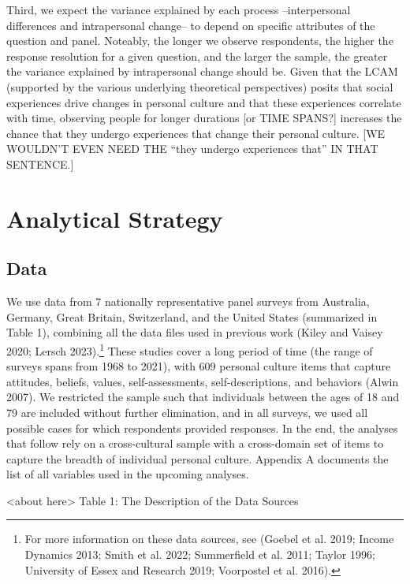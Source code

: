 \documentclass[
  11pt,
]{article}
\begin{document}
Third, we expect the variance explained by each process --interpersonal
differences and intrapersonal change-- to depend on specific attributes
of the question and panel. Noteably, the longer we observe respondents,
the higher the response resolution for a given question, and the larger
the sample, the greater the variance explained by intrapersonal change
should be. Given that the LCAM (supported by the various underlying
theoretical perspectives) posits that social experiences drive changes
in personal culture and that these experiences correlate with time,
observing people for longer durations {[}or TIME SPANS?{]} increases the
chance that they undergo experiences that change their personal culture.
{[}WE WOULDN'T EVEN NEED THE ``they undergo experiences that'' IN THAT
SENTENCE.{]}

\hypertarget{analytical-strategy}{%
\section{Analytical Strategy}\label{analytical-strategy}}

\hypertarget{data}{%
\subsection{Data}\label{data}}

We use data from 7 nationally representative panel surveys from
Australia, Germany, Great Britain, Switzerland, and the United States
(summarized in Table 1), combining all the data files used in previous
work (Kiley and Vaisey 2020; Lersch 2023).\footnote{For more information
  on these data sources, see (Goebel et al. 2019; Income Dynamics 2013;
  Smith et al. 2022; Summerfield et al. 2011; Taylor 1996; University of
  Essex and Research 2019; Voorpostel et al. 2016).} These studies cover
a long period of time (the range of surveys spans from 1968 to 2021),
with 609 personal culture items that capture attitudes, beliefs, values,
self-assessments, self-descriptions, and behaviors (Alwin 2007). We
restricted the sample such that individuals between the ages of 18 and
79 are included without further elimination, and in all surveys, we used
all possible cases for which respondents provided responses. In the end,
the analyses that follow rely on a cross-cultural sample with a
cross-domain set of items to capture the breadth of individual personal
culture. Appendix A documents the list of all variables used in the
upcoming analyses.

\begin{center}
<about here> 
Table 1: The Description of the Data Sources
\end{center}
\end{document}
